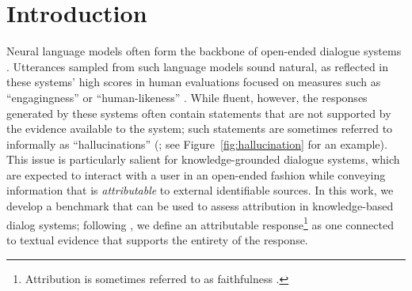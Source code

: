 \section{Introduction}




Neural language models \citep[][\textit{inter alia}]{bengio2000neural, vaswani2017attention, radford2019language} often form the backbone of open-ended dialogue systems \cite{wolf2019transfertransfo, zhang2019dialogpt, roller-etal-2021-recipes, adiwardana2020towards}. Utterances sampled from such language models sound natural, as reflected in these systems' high scores in human evaluations focused on measures such as ``engagingness'' or ``human-likeness'' \cite{see-etal-2019-makes}. While fluent, however, the responses generated by these systems often contain statements that are not supported by the evidence available to the system; such statements are sometimes referred to informally as ``hallucinations'' (\citealt{tian2020sticking, maynez-etal-2020-faithfulness, dziri-etal-2021-neural, shuster-etal-2021-retrieval-augmentation}; see Figure~\ref{fig:hallucination} for an example). This issue is particularly salient for knowledge-grounded dialogue systems, which are expected to interact with a user in an open-ended fashion while conveying information that is \textit{attributable} to external identifiable sources.
In this work, we develop a benchmark that can be used to assess attribution in knowledge-based dialog systems; following \citet{rashkin2021measuring}, we define
an attributable response\footnote{Attribution is sometimes referred to as faithfulness \citep[\textit{inter alia}]{cao-etal-2018,durmus-etal-2020-feqa}.} as one connected to textual evidence that supports the entirety of the response. 


